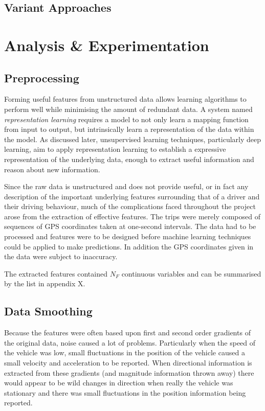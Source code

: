 \documentclass[a4paper, 11pt, twocolumn]{report}
\begin{document}
\subsection{Variant Approaches}






\section{Analysis \& Experimentation}

\subsection{Preprocessing}

Forming useful features from unstructured data allows learning algorithms to perform well while minimising the amount of redundant data.
A system named \textit{representation learning} requires a model to not only learn a mapping function from input to output, but intrinsically learn a representation of the data within the model.
As discussed later, unsupervised learning techniques, particularly deep learning, aim to apply representation learning to establish a expressive representation of the underlying data, enough to extract useful information and reason about new information.

Since the raw data is unstructured and does not provide useful, or in fact any description of the important underlying features surrounding that of a driver and their driving behaviour, much of the complications faced throughout the project arose from the extraction of effective features.
The trips were merely composed of sequences of GPS coordinates taken at one-second intervals.
The data had to be processed and features were to be designed before machine learning techniques could be applied to make predictions.
In addition the GPS coordinates given in the data were subject to inaccuracy.

The extracted features contained $N_F$ continuous variables and can be summarised by the list in appendix X.


\subsection{Data Smoothing}
Because the features were often based upon first and second order gradients of the original data, noise caused a lot of problems.
Particularly when the speed of the vehicle was low, small fluctuations in the position of the vehicle caused a small velocity and acceleration to be reported.
When directional information is extracted from these gradients (and magnitude information thrown away) there would appear to be wild changes in direction when really the vehicle was stationary and there was small fluctuations in the position information being reported.
\end{document}

